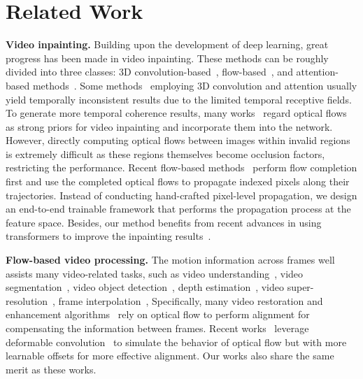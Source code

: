 \documentclass[final]{cvpr}
\newcommand{\subtitle}[1]{\noindent \textbf{#1}}
\begin{document}
\section{Related Work}
\subtitle{Video inpainting.}
Building upon the development of deep learning, great progress has been made in video inpainting.
These methods can be roughly divided into three classes: 3D convolution-based~\cite{wang2019video,chang2019learnable,hu2020proposal}, flow-based~\cite{Xu_2019_CVPR,Gao-ECCV-FGVC}, and attention-based methods~\cite{lee2019cpnet, li2020short, Liu_2021_FuseFormer, yan2020sttn}.
Some methods~\cite{chang2019free,kim2019deep,wang2019video,lee2019cpnet} employing 3D convolution and attention usually yield temporally inconsistent results due to the limited temporal receptive fields.
To generate more temporal coherence results, many works~\cite{kim2019deep,zou2020progressive} regard optical flows as strong priors for video inpainting and incorporate them into the network.
However, directly computing optical flows between images within invalid regions is extremely difficult as these regions themselves become occlusion factors, restricting the performance.
Recent flow-based methods~\cite{Xu_2019_CVPR, Gao-ECCV-FGVC} perform flow completion first and use the completed optical flows to propagate indexed pixels along their trajectories.
Instead of conducting hand-crafted pixel-level propagation, we design an end-to-end trainable framework that performs the propagation process at the feature space.
Besides, our method benefits from recent advances in using transformers to improve the inpainting results~\cite{yan2020sttn, liu2021decoupled, Liu_2021_FuseFormer}.

\subtitle{Flow-based video processing.}
The motion information across frames well assists many video-related tasks, such as video understanding~\cite{carreira2017quo, lin2019tsm}, video segmentation~\cite{tsai2016video, cheng2017segflow}, video object detection~\cite{zhu2017flow},
depth estimation~\cite{godard2019digging, luo2020consistent}, video super-resolution~\cite{xue2019video,chan2021basicvsr}, frame interpolation~\cite{jiang2018super,lee2020adacof}, \etc
Specifically, many video restoration and enhancement algorithms~\cite{kim2018spatio,xue2019video,tian2020tdan,pan2020cascaded,chan2021basicvsr} rely on optical flow to perform alignment for compensating the information between frames.
Recent works~\cite{wang2019edvr, xiang2020zooming, lee2020adacof, xu2021temporal, chan2021basicvsr} leverage deformable convolution~\cite{zhu2019deformable} to simulate the behavior of optical flow but with more learnable offsets for more effective alignment.
Our works also share the same merit as these works.
\end{document}
